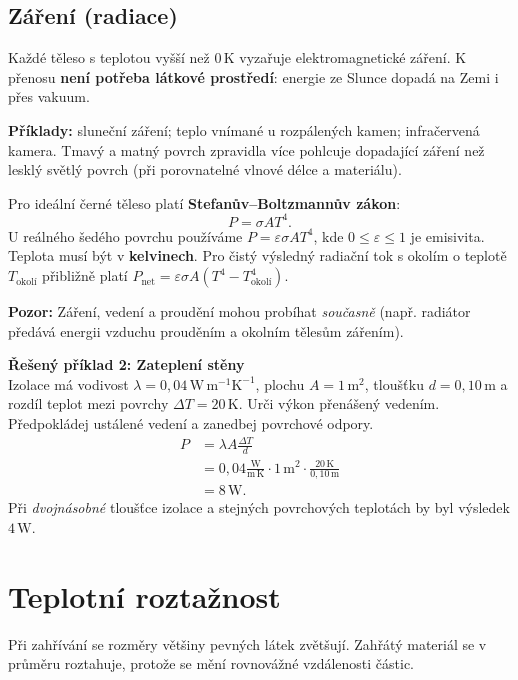 \documentclass[11pt,a4paper]{article}
\newcommand{\unit}[1]{\,\mathrm{#1}}
\begin{document}
\subsection{Záření (radiace)}
Každé těleso s teplotou vyšší než $0\unit K$ vyzařuje elektromagnetické záření. K přenosu \textbf{není potřeba látkové prostředí}: energie ze Slunce dopadá na Zemi i přes vakuum.

\textbf{Příklady:} sluneční záření; teplo vnímané u rozpálených kamen; infračervená kamera. Tmavý a matný povrch zpravidla více pohlcuje dopadající záření než lesklý světlý povrch (při porovnatelné vlnové délce a materiálu).

\begin{theorybox}
Pro ideální černé těleso platí \textbf{Stefanův--Boltzmannův zákon}:
\[
P=\sigma A T^4.
\]
U reálného šedého povrchu používáme $P=\varepsilon\sigma A T^4$, kde $0\leq\varepsilon\leq1$ je emisivita. Teplota musí být v \textbf{kelvinech}. Pro čistý výsledný radiační tok s okolím o teplotě $T_{\mathrm{okolí}}$ přibližně platí $P_{\mathrm{net}}=\varepsilon\sigma A(T^4-T_{\mathrm{okolí}}^4)$.
\end{theorybox}
\textbf{Pozor:} Záření, vedení a proudění mohou probíhat \emph{současně} (např. radiátor předává energii vzduchu prouděním a okolním tělesům zářením).

\begin{solvedbox}
\textbf{Řešený příklad 2: Zateplení stěny}\\
Izolace má vodivost $\lambda=0{,}04\unit{W\,m^{-1}K^{-1}}$, plochu $A=1\unit{m^2}$, tloušťku $d=0{,}10\unit m$ a rozdíl teplot mezi povrchy $\Delta T=20\unit K$. Urči výkon přenášený vedením. Předpokládej ustálené vedení a zanedbej povrchové odpory.
\begin{align*}
P&=\lambda A\frac{\Delta T}{d}\\
 &=0{,}04\frac{\mathrm W}{\mathrm{m\,K}}\cdot1\unit{m^2}\cdot
   \frac{20\unit K}{0{,}10\unit m}\\
 &=\boxed{8\unit W}.
\end{align*}
Při \emph{dvojnásobné} tloušťce izolace a stejných povrchových teplotách by byl výsledek $4\unit W$.
\end{solvedbox}

\section{Teplotní roztažnost}
Při zahřívání se rozměry většiny pevných látek zvětšují. Zahřátý materiál se v průměru roztahuje, protože se mění rovnovážné vzdálenosti částic.
\end{document}
